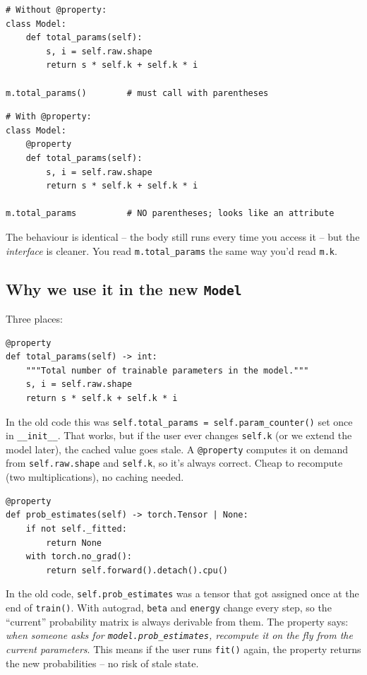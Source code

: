 \documentclass[11pt]{article}
\begin{document}
\begin{lstlisting}
# Without @property:
class Model:
    def total_params(self):
        s, i = self.raw.shape
        return s * self.k + self.k * i

m.total_params()        # must call with parentheses
\end{lstlisting}

\begin{lstlisting}
# With @property:
class Model:
    @property
    def total_params(self):
        s, i = self.raw.shape
        return s * self.k + self.k * i

m.total_params          # NO parentheses; looks like an attribute
\end{lstlisting}

The behaviour is identical -- the body still runs every time you access it --
but the \emph{interface} is cleaner. You read \texttt{m.total\_params} the
same way you'd read \texttt{m.k}.

\subsection{Why we use it in the new \texttt{Model}}

Three places:

\begin{lstlisting}
@property
def total_params(self) -> int:
    """Total number of trainable parameters in the model."""
    s, i = self.raw.shape
    return s * self.k + self.k * i
\end{lstlisting}

In the old code this was \texttt{self.total\_params = self.param\_counter()}
set once in \texttt{\_\_init\_\_}. That works, but if the user ever changes
\texttt{self.k} (or we extend the model later), the cached value goes stale.
A \texttt{@property} computes it on demand from \texttt{self.raw.shape} and
\texttt{self.k}, so it's always correct. Cheap to recompute (two
multiplications), no caching needed.

\begin{lstlisting}
@property
def prob_estimates(self) -> torch.Tensor | None:
    if not self._fitted:
        return None
    with torch.no_grad():
        return self.forward().detach().cpu()
\end{lstlisting}

In the old code, \texttt{self.prob\_estimates} was a tensor that got assigned
once at the end of \texttt{train()}. With autograd, \texttt{beta} and
\texttt{energy} change every step, so the ``current'' probability matrix is
always derivable from them. The property says: \emph{when someone asks for
\texttt{model.prob\_estimates}, recompute it on the fly from the current
parameters}. This means if the user runs \texttt{fit()} again, the property
returns the new probabilities -- no risk of stale state.
\end{document}
